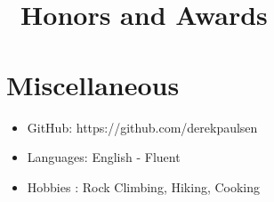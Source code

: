 \documentclass{resume}
\begin{document}
\section{\ Honors and Awards}

\section{Miscellaneous}
\begin{itemize}[parsep=0.5ex]
  \item GitHub: https://github.com/derekpaulsen
  \item Languages: English - Fluent
  \item Hobbies : Rock Climbing, Hiking, Cooking
\end{itemize}

%
%
\end{document}
